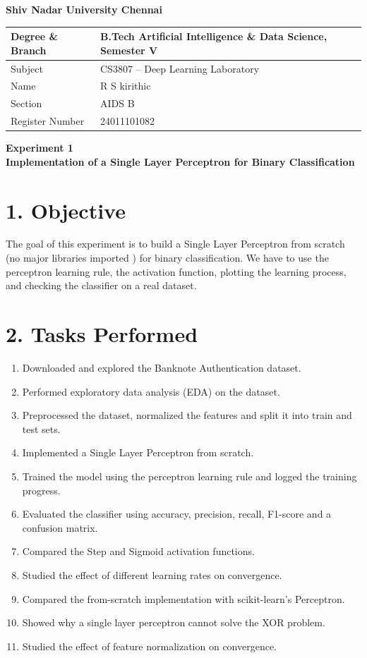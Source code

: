 \documentclass[11pt]{article}
\begin{document}
\begin{center}
{\Large\textbf{Shiv Nadar University Chennai}}
\end{center}

\renewcommand{\arraystretch}{1.25}

\begin{tabular}{|p{3.6cm}|p{7.6cm}|}
\hline
Degree \& Branch & B.Tech Artificial Intelligence \& Data Science, Semester V\\ \hline
Subject & CS3807 -- Deep Learning Laboratory\\ \hline
Name & R S kirithic\\ \hline
Section & AIDS B \\ \hline
Register Number & 24011101082\\ \hline
\end{tabular}

\vspace{4mm}
\begin{center}
{\large\textbf{Experiment 1}}\\
{\large\textbf{Implementation of a Single Layer Perceptron for Binary Classification}}
\end{center}

\section*{1. Objective}
The goal of this experiment is to build a Single
Layer Perceptron from scratch (no major libraries imported ) for binary classification. We have to use  the perceptron learning rule,  the activation function, plotting the learning process, and checking the classifier on a real dataset.

\section*{2. Tasks Performed}
\begin{enumerate}
\item Downloaded and explored the Banknote Authentication dataset.
\item Performed exploratory data analysis (EDA) on the dataset.
\item Preprocessed the dataset, normalized the features and split it into train and test sets.
\item Implemented a Single Layer Perceptron from scratch.
\item Trained the model using the perceptron learning rule and logged the training progress.
\item Evaluated the classifier using accuracy, precision, recall, F1-score and a confusion matrix.
\item Compared the Step and Sigmoid activation functions.
\item Studied the effect of different learning rates on convergence.
\item Compared the from-scratch implementation with scikit-learn's Perceptron.
\item Showed why a single layer perceptron cannot solve the XOR problem.
\item Studied the effect of feature normalization on convergence.
\end{enumerate}
\end{document}
